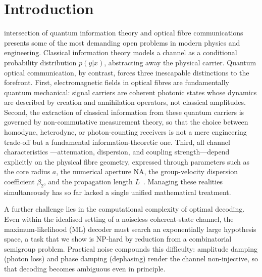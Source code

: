 \documentclass[journal,twocolumn]{IEEEtran}
\theoremstyle{definition}
\theoremstyle{plain}
\begin{document}
\section{Introduction}

 intersection of quantum information theory and
optical fibre communications presents some of the most demanding
open problems in modern physics and engineering.  Classical
information theory models a channel as a conditional probability
distribution $p(y|x)$, abstracting away the physical carrier.
Quantum optical communication, by contrast, forces three
inescapable distinctions to the forefront.  First, electromagnetic
fields in optical fibres are fundamentally quantum mechanical:
signal carriers are coherent photonic states whose dynamics are
described by creation and annihilation operators, not classical
amplitudes.  Second, the extraction of classical information from
these quantum carriers is governed by non-commutative measurement
theory, so that the choice between homodyne, heterodyne, or photon-counting
receivers is not a mere engineering trade-off but a fundamental
information-theoretic one.  Third, all channel characteristics
---attenuation, dispersion, and coupling strength---depend
explicitly on the physical fibre geometry, expressed through
parameters such as the core radius $a$, the numerical aperture
$\mathrm{NA}$, the group-velocity dispersion coefficient $\beta_2$,
and the propagation length $L$~\cite{snyder1983,agrawal2007}.
Managing these realities simultaneously has so far lacked a
single unified mathematical treatment.

A further challenge lies in the computational complexity of
optimal decoding.  Even within the idealised setting of a noiseless
coherent-state channel, the maximum-likelihood (ML) decoder must
search an exponentially large hypothesis space, a task that we show
is NP-hard by reduction from a combinatorial semigroup problem.
Practical noise compounds this difficulty: amplitude damping (photon
loss) and phase damping (dephasing) render the channel non-injective,
so that decoding becomes ambiguous even in principle.
\end{document}
